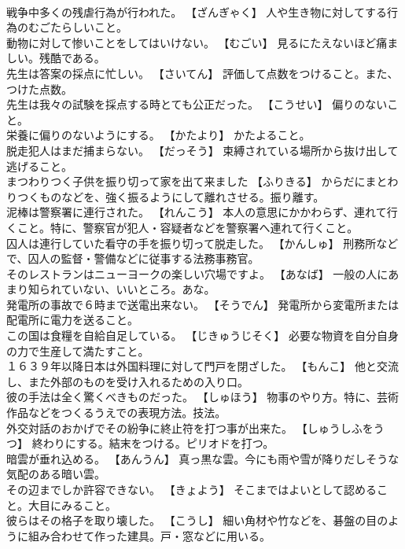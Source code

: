 \documentclass[8pt]{extreport}
\begin{document}
\begin{CJK}{UTF8}{min}
\\	戦争中多くの残虐行為が行われた。	【ざんぎゃく】 人や生き物に対してする行為のむごたらしいこと。
\\	動物に対して惨いことをしてはいけない。	【むごい】 見るにたえないほど痛ましい。残酷である。
\\	先生は答案の採点に忙しい。	【さいてん】 評価して点数をつけること。また、つけた点数。
\\	先生は我々の試験を採点する時とても公正だった。	【こうせい】 偏りのないこと。
\\	栄養に偏りのないようにする。	【かたより】 かたよること。
\\	脱走犯人はまだ捕まらない。	【だっそう】 束縛されている場所から抜け出して逃げること。
\\	まつわりつく子供を振り切って家を出て来ました	【ふりきる】 からだにまとわりつくものなどを、強く振るようにして離れさせる。振り離す。
\\	泥棒は警察署に連行された。	【れんこう】 本人の意思にかかわらず、連れて行くこと。特に、警察官が犯人・容疑者などを警察署へ連れて行くこと。
\\	囚人は連行していた看守の手を振り切って脱走した。	【かんしゅ】 刑務所などで、囚人の監督・警備などに従事する法務事務官。
\\	そのレストランはニューヨークの楽しい穴場ですよ。	【あなば】 一般の人にあまり知られていない、いいところ。あな。
\\	発電所の事故で６時まで送電出来ない。	【そうでん】 発電所から変電所または配電所に電力を送ること。
\\	この国は食糧を自給自足している。	【じきゅうじそく】 必要な物資を自分自身の力で生産して満たすこと。
\\	１６３９年以降日本は外国料理に対して門戸を閉ざした。	【もんこ】 他と交流し、また外部のものを受け入れるための入り口。
\\	彼の手法は全く驚くべきものだった。	【しゅほう】 物事のやり方。特に、芸術作品などをつくるうえでの表現方法。技法。
\\	外交対話のおかげでその紛争に終止符を打つ事が出来た。	【しゅうしふをうつ】 終わりにする。結末をつける。ピリオドを打つ。
\\	暗雲が垂れ込める。	【あんうん】 真っ黒な雲。今にも雨や雪が降りだしそうな気配のある暗い雲。
\\	その辺までしか許容できない。	【きょよう】 そこまではよいとして認めること。大目にみること。
\\	彼らはその格子を取り壊した。	【こうし】 細い角材や竹などを、碁盤の目のように組み合わせて作った建具。戸・窓などに用いる。

\end{CJK}
\end{document}
